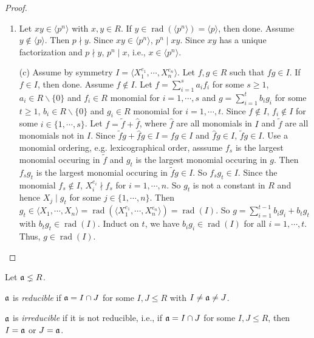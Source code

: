 \begin{proof}
    \begin{enumerate}
        \item Let $xy \in \langle p^{n} \rangle$ with $x,y \in R$. If $y \in \operatorname{rad}(\langle p^{n} \rangle) = \langle p \rangle$, then done. Assume $y \not \in \langle p \rangle$. Then $p \nmid y$. Since $xy \in \langle p^{n} \rangle$, $p^{n} \mid xy$. Since $xy$ has a unique factorization and $p \nmid y$, $p^{n} \mid x$, i.e., $x \in \langle p^{n} \rangle$.
        \item [(c)]  Assume by symmetry $I = \langle X_1^{e_1},\cdots,X_n^{e_n} \rangle$. Let $f,g \in R$ such that $fg \in I$. If $f \in I$, then done. Assume $f \not\in I$. Let $f = \sum_{i=1}^{s}a_if_i$ for some $s \geq 1$, $a_i \in R \smallsetminus \{0\}$ and $f_i \in R$ monomial for $i = 1,\cdots,s$ and $g = \sum_{i=1}^{t}b_ig_i$ for some $t \geq 1$, $b_i \in R \smallsetminus \{0\}$ and $g_i \in R$ monomial for $i = 1,\cdots,t$. Since $f \not \in I$, $f_i \not \in I$ for some $i \in \{1,\cdots,s\}$. Let $f = \tilde f + \hat f$, where $\hat f$ are all monomials in $I$ and $\tilde f$ are all monomials not in $I$. Since $\tilde f g + \hat f g \in I = fg \in I$ and $\hat f g \in I$, $\tilde f g \in I$. Use a monomial ordering, e.g. lexicographical order, asssume $f_s$ is the largest monomial occuring in $\tilde f$ and $g_t$ is the largest monomial occuring in $g$. Then $f_sg_t$ is the largest monomial occuring in $\tilde fg \in I$. So $f_sg_t \in I$. Since the monomial $f_s \not \in I$, $X_i^{e_i} \nmid f_s$ for $i = 1,\cdots,n$. So $g_t$ is not a constant in $R$ and hence $X_j \mid g_t$ for some $j \in \{1,\cdots,n\}$. Then $g_t \in \langle X_1,\cdots,X_n \rangle = \operatorname{rad}(\langle X_1^{e_1},\cdots,X_n^{e_n} \rangle) = \operatorname{rad}(I)$. So $g = \sum_{i=1}^{t-1}b_ig_i + b_tg_t$ with $b_tg_t \in \operatorname{rad}(I)$. Induct on $t$, we have $b_ig_i \in \operatorname{rad}(I)$ for all $i = 1,\cdots,t$. Thus, $g \in \operatorname{rad}(I)$. \qedhere
    \end{enumerate}
\end{proof}

\noindent Let $\mathfrak{a} \lneq R$.

\begin{definition}
    $\mathfrak{a}$ is \emph{reducible} if $\mathfrak{a} = I \cap J$ for some $I,J \leq R$ with $I \neq \mathfrak{a} \neq J$. \par
    $\mathfrak{a}$ is \emph{irreducible} if it is not reducible, i.e., if $\mathfrak{a} = I \cap J$ for some $I,J \leq R$, then $I = \mathfrak{a}$ or $J = \mathfrak{a}$.
\end{definition}

